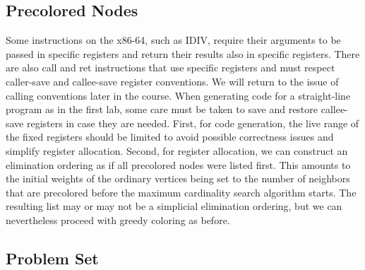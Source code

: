 \subsection{ Precolored Nodes}
Some instructions on the x86-64, such as IDIV, require their arguments to
be passed in specific registers and return their results also in specific registers. There are also call and ret instructions that use specific registers
and must respect caller-save and callee-save register conventions. We will
return to the issue of calling conventions later in the course. When generating code for a straight-line program as in the first lab, some care must be
taken to save and restore callee-save registers in case they are needed.
First, for code generation, the live range of the fixed registers should be
limited to avoid possible correctness issues and simplify register allocation.
Second, for register allocation, we can construct an elimination ordering as if all precolored nodes were listed first. This amounts to the initial weights of the ordinary vertices being set to the number of neighbors
that are precolored before the maximum cardinality search algorithm starts.
The resulting list may or may not be a simplicial elimination ordering, but
we can nevertheless proceed with greedy coloring as before.




\subsection{Problem Set}

